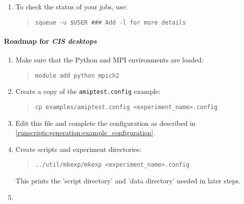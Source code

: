 \begin{enumerate}
\item 

To check the status of your jobs, use:
%
\begin{quote}
\begin{verbatim}
squeue -u $USER ### Add -l for more details
\end{verbatim}
\end{quote}

\end{enumerate}


\paragraph*{Roadmap for \emph{CIS desktops}}
\label{runscripts:generation:desktops}

\begin{enumerate}

\item

Make sure that the Python and MPI environments are loaded:
\begin{quote}
\begin{verbatim}
module add python mpich2
\end{verbatim}
\end{quote}

\item

Create a copy of the \texttt{amiptest.config} example:
%
\begin{quote}
\begin{verbatim}
cp examples/amiptest.config <experiment_name>.config
\end{verbatim}
\end{quote}

\item

Edit this file and complete the configuration as described in
\ref{runscripts:generation:example_configuration}.

\item

Create scripts and experiment directories:
\begin{quote}
\begin{verbatim}
../util/mkexp/mkexp <experiment_name>.config
\end{verbatim}
\end{quote}
This prints the 'script directory' and 'data directory' needed in later steps.

\item


\end{enumerate}
